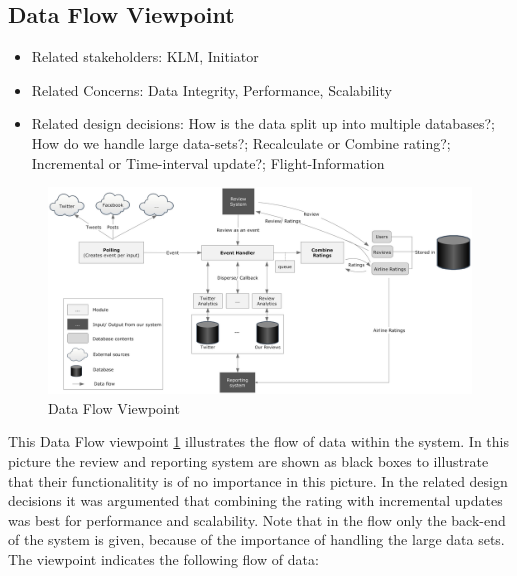 % 

\subsection{Data Flow Viewpoint}

\begin{itemize}
\item Related stakeholders: KLM, Initiator
\item Related Concerns: Data Integrity, Performance, Scalability
\item Related design decisions: How is the data split up into multiple databases?; How do we handle large data-sets?; Recalculate or Combine rating?; Incremental or Time-interval update?; Flight-Information
\end{itemize}

\newpage
\begin{landscape}
\begin{figure}
\includegraphics[width=600px]{DataFlowGraph}
\caption{Data Flow Viewpoint}
\label{fig:Data Flow}
\end{figure}
\end{landscape}

This Data Flow viewpoint \ref{fig:Data Flow} illustrates the flow of data within the system. In this picture the review and reporting system are shown as black boxes to illustrate that their functionalitity is of no importance in this picture.
In the related design decisions it was argumented that combining the rating with incremental updates was best for performance and scalability. Note that in the flow only the back-end of the system is given, because of the importance of handling the large data sets. The viewpoint indicates the following flow of data:

